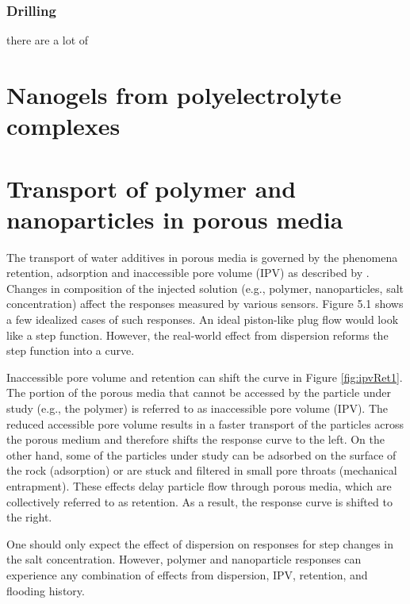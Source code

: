 \subsubsection*{Drilling}
there are a lot of 


\section{Nanogels from polyelectrolyte complexes}


\section{Transport of polymer and nanoparticles in porous media}
The transport of water additives in porous media is governed by the phenomena retention, adsorption and inaccessible pore volume (IPV) as described by \citep{Lotsch1985}. Changes in composition of the injected solution (e.g., polymer, nanoparticles, salt concentration) affect the responses measured by various sensors. Figure 5.1 shows a few idealized cases of such responses. An ideal piston-like plug flow would look like a step function. However, the real-world effect from dispersion reforms the step function into a curve.

Inaccessible pore volume and retention can shift the curve in Figure \ref{fig:ipvRet1}. The portion of the porous media that cannot be accessed by the particle under study (e.g., the polymer) is referred to as inaccessible pore volume (IPV). The reduced accessible pore volume results in a faster transport of the particles across the porous medium and therefore shifts the response curve to the left. On the other hand, some of the particles under study can be adsorbed on the surface of the rock (adsorption) or are stuck and filtered in small pore throats (mechanical entrapment). These effects delay particle flow through porous media, which are collectively referred to as retention. As a result, the response curve is shifted to the right. 

One should only expect the effect of dispersion on responses for step changes in the salt concentration. However, polymer and nanoparticle responses can experience any combination of effects from dispersion, IPV, retention, and flooding history.

